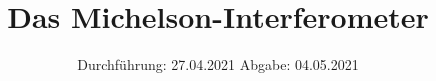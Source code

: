 

\subject{V401}
\title{Das Michelson-Interferometer}
\date{%
  Durchführung: 27.04.2021
  \hspace{3em}
  Abgabe: 04.05.2021
}



\maketitle
\thispagestyle{empty}
\tableofcontents
\newpage






\printbibliography{}


